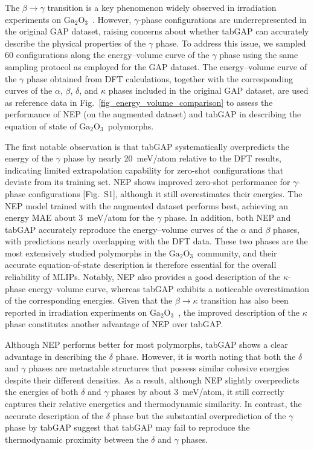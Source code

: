 \documentclass[%
reprint,
superscriptaddress,
 amsmath,amssymb,
 aps,
]{revtex4-2}
\newcommand{\ga}{$\text{Ga}_2\text{O}_3$}
\begin{document}
The $\beta \to \gamma$ transition is a key phenomenon widely observed in irradiation
experiments on \ga\
\cite{zhao_crystallization_2025,han_electronic_2025,abdullaev_ions_2025}.
However, $\gamma$-phase configurations are underrepresented in the original GAP dataset,
raising concerns about whether tabGAP can accurately describe the physical properties of
the $\gamma$ phase.
To address this issue, we sampled 60 configurations along the energy--volume curve of the
$\gamma$ phase using the same sampling protocol as employed for the GAP dataset.
The energy--volume curve of the $\gamma$ phase obtained from DFT calculations, together
with the corresponding curves of the $\alpha$, $\beta$, $\delta$, and $\kappa$ phases
included in the original GAP dataset, are used as reference data in
Fig.~\ref{fig_energy_volume_comparison} to assess the performance of NEP (on the augmented dataset) 
and tabGAP in describing the equation of state of \ga\ polymorphs.

The first notable observation is that tabGAP systematically overpredicts the energy of
the $\gamma$ phase by nearly 20~meV/atom relative to the DFT results, indicating limited
extrapolation capability for zero-shot configurations that deviate from its training set.
NEP shows improved zero-shot performance for $\gamma$-phase configurations
[Fig.~S1], although it still overestimates their energies.
The NEP model trained with the augmented dataset performs best, achieving an energy MAE
about 3~meV/atom for the $\gamma$ phase.
In addition, both NEP and tabGAP accurately reproduce the energy--volume curves of the
$\alpha$ and $\beta$ phases, with predictions nearly overlapping with the DFT data.
These two phases are the most extensively studied polymorphs in the \ga\ community, and
their accurate equation-of-state description is therefore essential for the overall
reliability of MLIPs.
Notably, NEP also provides a good description of the $\kappa$-phase energy--volume curve,
whereas tabGAP exhibits a noticeable overestimation of the corresponding energies.
Given that the $\beta \to \kappa$ transition has also been reported in irradiation
experiments on \ga\ \cite{han_electronic_2025}, the improved description of the $\kappa$
phase constitutes another advantage of NEP over tabGAP.

Although NEP performs better for most polymorphs, tabGAP shows a clear advantage in
describing the $\delta$ phase.
However, it is worth noting that both the $\delta$ and $\gamma$ phases are 
metastable structures that possess similar cohesive energies despite their different densities.
As a result, although NEP slightly overpredicts the energies of both $\delta$ and $\gamma$
phases by about 3~meV/atom, it still correctly captures their relative energetics and
thermodynamic similarity.
In contrast, the accurate description of the $\delta$ phase but the substantial
overprediction of the $\gamma$ phase by tabGAP suggest that tabGAP may fail to reproduce
the thermodynamic proximity between the $\delta$ and $\gamma$ phases.
\end{document}
